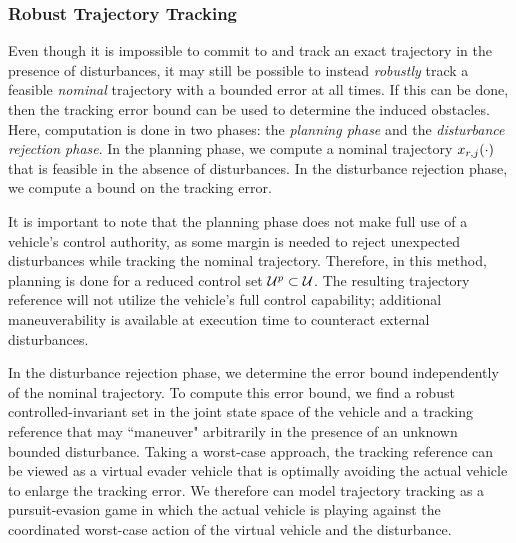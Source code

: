 \subsubsection{Robust Trajectory Tracking\label{sec:rtt}}
Even though it is impossible to commit to and track an exact trajectory in the presence of disturbances, it may still be possible to instead \textit{robustly} track a feasible \textit{nominal} trajectory with a bounded error at all times. If this can be done, then the tracking error bound can be used to determine the induced obstacles. Here, computation is done in two phases: the \textit{planning phase} and the \textit{disturbance rejection phase}. In the planning phase, we compute a nominal trajectory $x_{r,j}(\cdot)$ that is feasible in the absence of disturbances. In the disturbance rejection phase, we compute a bound on the tracking error.%

It is important to note that the planning phase does not make full use of a vehicle's control authority, as some margin is needed to reject unexpected disturbances while tracking the nominal trajectory. Therefore, in this method, planning is done for a reduced control set $\mathcal{U}^p\subset\mathcal{U}$. The resulting trajectory reference will not utilize the vehicle's full control capability; additional maneuverability is available at execution time to counteract external disturbances.

In the disturbance rejection phase, we determine the error bound independently of the nominal trajectory. To compute this error bound, we find a robust controlled-invariant set in the joint state space of the vehicle and a tracking reference that may ``maneuver" arbitrarily in the presence of an unknown bounded disturbance. Taking a worst-case approach, the tracking reference can be viewed as a virtual evader vehicle that is optimally avoiding the actual vehicle to enlarge the tracking error. We therefore can model trajectory tracking as a pursuit-evasion game in which the actual vehicle is playing against the coordinated worst-case action of the virtual vehicle and the disturbance. %


